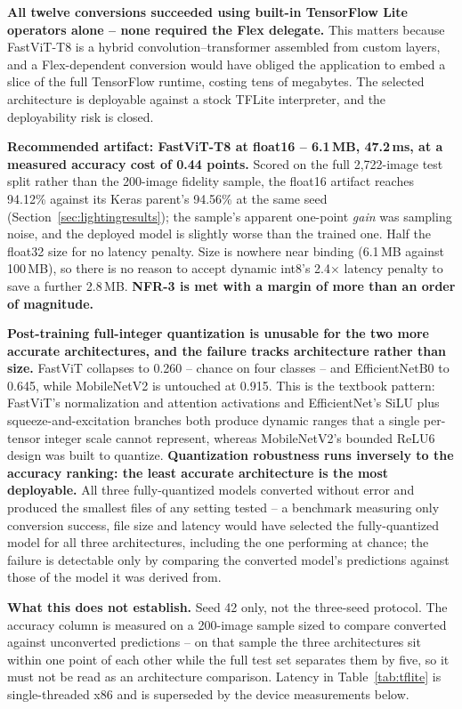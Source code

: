 \documentclass{article}
\begin{document}
\textbf{All twelve conversions succeeded using built-in TensorFlow Lite operators alone -- none required
the Flex delegate.} This matters because FastViT-T8 is a hybrid convolution--transformer assembled from
custom layers, and a Flex-dependent conversion would have obliged the application to embed a slice of the
full TensorFlow runtime, costing tens of megabytes. The selected architecture is deployable against a
stock TFLite interpreter, and the deployability risk is closed.

\textbf{Recommended artifact: FastViT-T8 at float16 -- 6.1\,MB, 47.2\,ms, at a measured accuracy cost of
0.44 points.} Scored on the full 2,722-image test split rather than the 200-image fidelity sample, the
float16 artifact reaches 94.12\% against its Keras parent's 94.56\% at the same seed
(Section~\ref{sec:lightingresults}); the sample's apparent one-point \textit{gain} was sampling noise,
and the deployed model is slightly worse than the trained one. Half the
float32 size for no latency penalty. Size is nowhere near binding (6.1\,MB against 100\,MB), so there is
no reason to accept dynamic int8's 2.4$\times$ latency penalty to save a further 2.8\,MB. \textbf{NFR-3 is
met with a margin of more than an order of magnitude.}

\textbf{Post-training full-integer quantization is unusable for the two more accurate architectures, and
the failure tracks architecture rather than size.} FastViT collapses to 0.260 -- chance on four classes --
and EfficientNetB0 to 0.645, while MobileNetV2 is untouched at 0.915. This is the textbook pattern:
FastViT's normalization and attention activations and EfficientNet's SiLU plus squeeze-and-excitation
branches both produce dynamic ranges that a single per-tensor integer scale cannot represent, whereas
MobileNetV2's bounded ReLU6 design was built to quantize. \textbf{Quantization robustness runs inversely
to the accuracy ranking: the least accurate architecture is the most deployable.} All three fully-quantized
models converted without error and produced the smallest files of any setting tested -- a benchmark
measuring only conversion success, file size and latency would have selected the fully-quantized model for
all three architectures, including the one performing at chance; the failure is detectable only by
comparing the converted model's predictions against those of the model it was derived from.

\textbf{What this does not establish.} Seed 42 only, not the three-seed protocol. The accuracy column is
measured on a 200-image sample sized to compare converted against unconverted predictions -- on that
sample the three architectures sit within one point of each other while the full test set separates them
by five, so it must not be read as an architecture comparison. 
Latency in Table~\ref{tab:tflite} is single-threaded x86 and is superseded by the device measurements
below.
\end{document}
